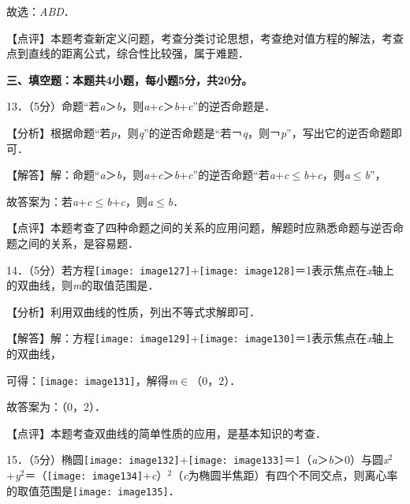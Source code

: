 \documentclass[a4paper,11pt,UTF8,twoside]{ctexart} %
\begin{document}
故选：\textit{ABD}．

【点评】本题考查新定义问题，考查分类讨论思想，考查绝对值方程的解法，考查点到直线的距离公式，综合性比较强，属于难题．

\textbf{三、填空题：本题共4小题，每小题5分，共20分。}

13．（5分）命题``若\textit{a}＞\textit{b}，则\textit{a}+\textit{c}＞\textit{b}+\textit{c}''的逆否命题是\textit{}\underbar{+}\textit{}\underbar{$\mathrm{\le}$}\textit{}\underbar{+}\textit{}\textit{}\underbar{$\mathrm{\le}$}\textit{}\underbar{　}．

【分析】根据命题``若\textit{p}，则\textit{q}''的逆否命题是``若￢\textit{q}，则￢\textit{p}''，写出它的逆否命题即可．

【解答】解：命题``\textit{a}＞\textit{b}，则\textit{a}+\textit{c}＞\textit{b}+\textit{c}''的逆否命题``若\textit{a}+\textit{c}$\mathrm{\le}$\textit{b}+\textit{c}，则\textit{a}$\mathrm{\le}$\textit{b}''，

故答案为：若\textit{a}+\textit{c}$\mathrm{\le}$\textit{b}+\textit{c}，则\textit{a}$\mathrm{\le}$\textit{b}．

【点评】本题考查了四种命题之间的关系的应用问题，解题时应熟悉命题与逆否命题之间的关系，是容易题．

14．（5分）若方程\texttt{[image: image127]}+\texttt{[image: image128]}＝1表示焦点在\textit{x}轴上的双曲线，则\textit{m}的取值范围是．

【分析】利用双曲线的性质，列出不等式求解即可．

【解答】解：方程\texttt{[image: image129]}+\texttt{[image: image130]}＝1表示焦点在\textit{x}轴上的双曲线，

可得：\texttt{[image: image131]}，解得\textit{m}$\mathrm{\in }$（0，2）．

故答案为：（0，2）．

【点评】本题考查双曲线的简单性质的应用，是基本知识的考查．

15．（5分）椭圆\texttt{[image: image132]}+\texttt{[image: image133]}＝1（\textit{a}＞\textit{b}＞0）与圆\textit{x}${}^{2}$+\textit{y}${}^{2}$＝（\texttt{[image: image134]}+\textit{c}）${}^{2}$（\textit{c}为椭圆半焦距）有四个不同交点，则离心率的取值范围是\underbar{　}\texttt{[image: image135]}\underbar{　}．
\end{document}
